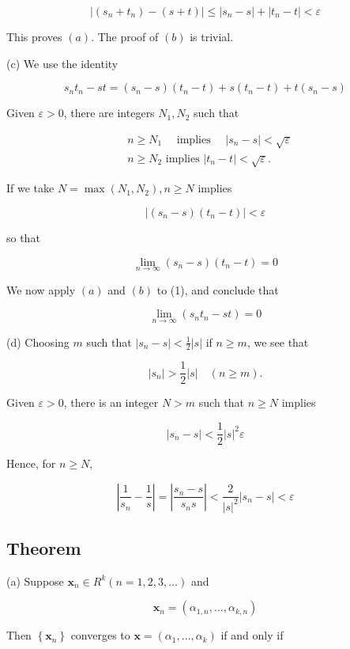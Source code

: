 \documentclass[10pt]{article}
\begin{document}
$$
\left|\left(s_{n}+t_{n}\right)-(s+t)\right| \leq\left|s_{n}-s\right|+\left|t_{n}-t\right|<\varepsilon
$$

This proves $(a)$. The proof of $(b)$ is trivial.

(c) We use the identity

$$
s_{n} t_{n}-s t=\left(s_{n}-s\right)\left(t_{n}-t\right)+s\left(t_{n}-t\right)+t\left(s_{n}-s\right)
$$

Given $\varepsilon>0$, there are integers $N_{1}, N_{2}$ such that

$$
\begin{aligned}
& n \geq N_{1} \quad \text { implies } \quad\left|s_{n}-s\right|<\sqrt{\varepsilon} \\
& n \geq N_{2} \text { implies }\left|t_{n}-t\right|<\sqrt{\varepsilon} \text {. }
\end{aligned}
$$

If we take $N=\max \left(N_{1}, N_{2}\right), n \geq N$ implies

$$
\left|\left(s_{n}-s\right)\left(t_{n}-t\right)\right|<\varepsilon
$$

so that

$$
\lim _{n \rightarrow \infty}\left(s_{n}-s\right)\left(t_{n}-t\right)=0
$$

We now apply $(a)$ and $(b)$ to (1), and conclude that

$$
\lim _{n \rightarrow \infty}\left(s_{n} t_{n}-s t\right)=0
$$

(d) Choosing $m$ such that $\left|s_{n}-s\right|<\frac{1}{2}|s|$ if $n \geq m$, we see that

$$
\left|s_{n}\right|>\frac{1}{2}|s| \quad(n \geq m) .
$$

Given $\varepsilon>0$, there is an integer $N>m$ such that $n \geq N$ implies

$$
\left|s_{n}-s\right|<\frac{1}{2}|s|^{2} \varepsilon
$$

Hence, for $n \geq N$,

$$
\left|\frac{1}{s_{n}}-\frac{1}{s}\right|=\left|\frac{s_{n}-s}{s_{n} s}\right|<\frac{2}{|s|^{2}}\left|s_{n}-s\right|<\varepsilon
$$

\subsection{Theorem}
(a) Suppose $\mathbf{x}_{n} \in R^{k}(n=1,2,3, \ldots)$ and

$$
\mathbf{x}_{n}=\left(\alpha_{1, n}, \ldots, \alpha_{k, n}\right)
$$

Then $\left\{\mathbf{x}_{n}\right\}$ converges to $\mathbf{x}=\left(\alpha_{1}, \ldots, \alpha_{k}\right)$ if and only if
\end{document}
